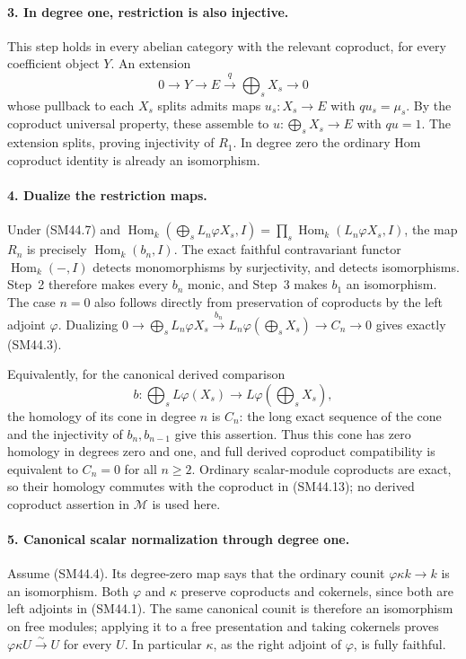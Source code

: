 \paragraph{3. In degree one, restriction is also injective.}
This step holds in every abelian category with the relevant
coproduct, for every coefficient object \(Y\).  An extension
\[
                0\longrightarrow Y\longrightarrow E
                   \xrightarrow{q}\bigoplus_sX_s\longrightarrow0
\]
whose pullback to each \(X_s\) splits admits maps
\(u_s:X_s\to E\) with \(qu_s=\mu_s\).  By the coproduct
universal property, these assemble to \(u:\bigoplus_sX_s\to E\)
with \(qu=1\).  The extension splits, proving injectivity
of \(R_1\).  In degree zero the ordinary Hom coproduct
identity is already an isomorphism.

\paragraph{4. Dualize the restriction maps.}
Under (SM44.7) and
\(\operatorname{Hom}_k(\bigoplus_sL_n\varphi X_s,I)
=\prod_s\operatorname{Hom}_k(L_n\varphi X_s,I)\),
the map \(R_n\) is precisely \(\operatorname{Hom}_k(b_n,I)\).
The exact faithful contravariant functor
\(\operatorname{Hom}_k(-,I)\) detects monomorphisms by
surjectivity, and detects isomorphisms.  Step~2 therefore
makes every \(b_n\) monic, and Step~3 makes \(b_1\) an
isomorphism.  The case \(n=0\) also follows directly from
preservation of coproducts by the left adjoint \(\varphi\).
Dualizing
\(0\to\bigoplus_sL_n\varphi X_s\xrightarrow{b_n}
L_n\varphi(\bigoplus_sX_s)\to C_n\to0\)
gives exactly (SM44.3).

Equivalently, for the canonical derived comparison
\[
 b:\bigoplus_s L\varphi(X_s)
                \longrightarrow L\varphi\!\left(\bigoplus_sX_s\right),
                                                               \tag{SM44.13}
\]
the homology of its cone in degree \(n\) is \(C_n\): the
long exact sequence of the cone and the injectivity of
\(b_n,b_{n-1}\) give this assertion.  Thus this cone has
zero homology in degrees zero and one, and full derived
coproduct compatibility is equivalent to \(C_n=0\) for
all \(n\ge2\).  Ordinary scalar-module coproducts are exact,
so their homology commutes with the coproduct in (SM44.13);
no derived coproduct assertion in \(\mathcal M\) is used here.

\paragraph{5. Canonical scalar normalization through degree one.}
Assume (SM44.4).  Its degree-zero map says that the ordinary
counit \(\varphi\kappa k\to k\) is an isomorphism.
Both \(\varphi\) and \(\kappa\) preserve coproducts and
cokernels, since both are left adjoints in (SM44.1).
The same canonical counit is therefore an isomorphism on
free modules; applying it to a free presentation and taking
cokernels proves
\(\varphi\kappa U\xrightarrow{\sim}U\) for every \(U\).
In particular \(\kappa\), as the right adjoint of
\(\varphi\), is fully faithful.

